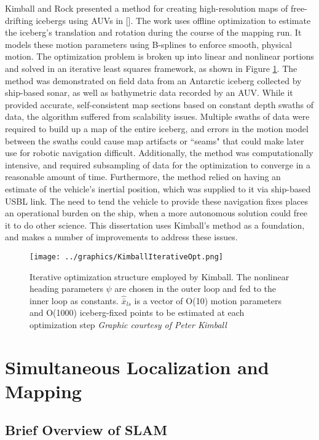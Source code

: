  Kimball and Rock presented a method for creating high-resolution maps of free-drifting icebergs using AUVs in [\cite{Kimball2011}]. The work uses offline optimization to estimate the iceberg's translation and rotation during the course of the mapping run. It models these motion parameters using B-splines \cite{} to enforce smooth, physical motion. The optimization problem is broken up into linear and nonlinear portions and solved in an iterative least squares framework, as shown in Figure \ref{fig:NestedLoopRelatedWork}. The method was demonstrated on field data from an Antarctic iceberg collected by ship-based sonar, as well as bathymetric data recorded by an AUV. While it provided accurate, self-consistent map sections based on constant depth swaths of data, the algorithm suffered from scalability issues. Multiple swaths of data were required to build up a map of the entire iceberg, and errors in the motion model between the swaths could cause map artifacts or ``seams" that could make later use for robotic navigation difficult. Additionally, the method was computationally intensive, and required subsampling of data for the optimization to converge in a reasonable amount of time. Furthermore, the method relied on having an estimate of the vehicle's inertial position, which was supplied to it via ship-based USBL link. The need to tend the vehicle to provide these navigation fixes places an operational burden on the ship, when a more autonomous solution could free it to do other science. This dissertation uses Kimball's method as a foundation, and makes a number of improvements to address these issues. 

\begin{figure}[htbp]
   \centering
   \texttt{[image: ../graphics/KimballIterativeOpt.png]} %
   \caption{Iterative optimization structure employed by Kimball. The nonlinear heading parameters $\psi$ are chosen in the outer loop and fed to the inner loop as constants. $\hat{\bar{x}}_{ls}$ is a vector of O(10) motion parameters and O(1000) iceberg-fixed points to be estimated at each optimization step  \emph{Graphic courtesy of Peter Kimball}}
   \label{fig:NestedLoopRelatedWork}
\end{figure}

\section{Simultaneous Localization and Mapping}

\subsection{Brief Overview of SLAM}


